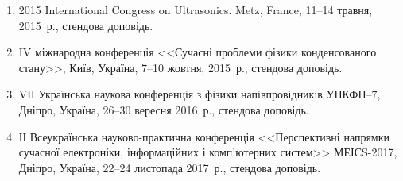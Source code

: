 \begin{enumerate}[label=\arabic*.,leftmargin=1em,itemindent=1em]
\item
2015 International Congress on Ultrasonics. Metz, France, 11--14 травня, 2015~р., стендова доповідь.

\item
IV міжнародна конференція <<Сучасні проблеми фізики конденсованого стану>>, Київ, Україна, 7--10 жовтня, 2015~р., стендова доповідь.

\item
VІІ Українська наукова конференція з фізики напівпровідників УНКФН--7, Дніпро, Україна, 26--30 вересня 2016~р., стендова доповідь.


\item
ІІ Всеукраїнська науково-практична конференція <<Перспективні напрямки
сучасної електроніки,
інформаційних і комп'ютерних
систем>> МЕІСS-2017, Дніпро, Україна, 22--24 листопада 2017~р., стендова доповідь.

\end{enumerate}

